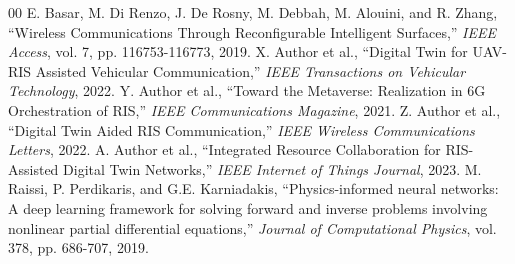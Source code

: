 \documentclass[conference]{IEEEtran}
\begin{document}
\begin{thebibliography}{00}
 E. Basar, M. Di Renzo, J. De Rosny, M. Debbah, M. Alouini, and R. Zhang, ``Wireless Communications Through Reconfigurable Intelligent Surfaces,'' \emph{IEEE Access}, vol. 7, pp. 116753-116773, 2019.
 X. Author et al., ``Digital Twin for UAV-RIS Assisted Vehicular Communication,'' \emph{IEEE Transactions on Vehicular Technology}, 2022.
 Y. Author et al., ``Toward the Metaverse: Realization in 6G Orchestration of RIS,'' \emph{IEEE Communications Magazine}, 2021.
 Z. Author et al., ``Digital Twin Aided RIS Communication,'' \emph{IEEE Wireless Communications Letters}, 2022.
 A. Author et al., ``Integrated Resource Collaboration for RIS-Assisted Digital Twin Networks,'' \emph{IEEE Internet of Things Journal}, 2023.
 M. Raissi, P. Perdikaris, and G.E. Karniadakis, ``Physics-informed neural networks: A deep learning framework for solving forward and inverse problems involving nonlinear partial differential equations,'' \emph{Journal of Computational Physics}, vol. 378, pp. 686-707, 2019.
\end{thebibliography}
\end{document}
